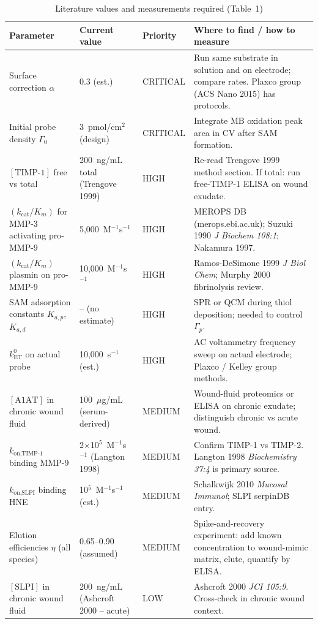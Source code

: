 \documentclass[10pt,a4paper]{article}
\begin{document}
\begin{table}[H]
\caption{Literature values and measurements required (Table~1)}
{\small
\begin{tabularx}{\linewidth}{p{3.6cm}p{2.8cm}p{1.4cm}p{6.0cm}}
\toprule
Parameter & Current value & Priority & Where to find / how to measure \\
\midrule
Surface correction $\alpha$ & 0.3 (est.) & CRITICAL & Run same substrate in solution and on electrode; compare rates. Plaxco group (ACS Nano 2015) has protocols. \\
Initial probe density $\Gamma_0$ & 3~pmol/cm$^2$ (design) & CRITICAL & Integrate MB oxidation peak area in CV after SAM formation. \\
$[\text{TIMP-1}]$ free vs total & 200~ng/mL total (Trengove 1999) & HIGH & Re-read Trengove 1999 method section. If total: run free-TIMP-1 ELISA on wound exudate. \\
$(k_\text{cat}/K_m)$ for MMP-3 activating pro-MMP-9 & 5,000~M$^{-1}$s$^{-1}$ & HIGH & MEROPS DB (merops.ebi.ac.uk); Suzuki 1990 \textit{J Biochem 108:1}; Nakamura 1997. \\
$(k_\text{cat}/K_m)$ plasmin on pro-MMP-9 & 10,000~M$^{-1}$s$^{-1}$ & HIGH & Ramos-DeSimone 1999 \textit{J Biol Chem}; Murphy 2000 fibrinolysis review. \\
SAM adsorption constants $K_{a,p}$, $K_{a,d}$ & -- (no estimate) & HIGH & SPR or QCM during thiol deposition; needed to control $\Gamma_p$. \\
$k_\text{ET}^0$ on actual probe & 10,000~s$^{-1}$ (est.) & HIGH & AC voltammetry frequency sweep on actual electrode; Plaxco / Kelley group methods. \\
$[\text{A1AT}]$ in chronic wound fluid & 100~$\mu$g/mL (serum-derived) & MEDIUM & Wound-fluid proteomics or ELISA on chronic exudate; distinguish chronic vs acute wound. \\
$k_\text{on,TIMP-1}$ binding MMP-9 & 2$\times$10$^5$~M$^{-1}$s$^{-1}$ (Langton 1998) & MEDIUM & Confirm TIMP-1 vs TIMP-2. Langton 1998 \textit{Biochemistry 37:4} is primary source. \\
$k_\text{on,SLPI}$ binding HNE & 10$^5$~M$^{-1}$s$^{-1}$ (est.) & MEDIUM & Schalkwijk 2010 \textit{Mucosal Immunol}; SLPI serpinDB entry. \\
Elution efficiencies $\eta$ (all species) & 0.65--0.90 (assumed) & MEDIUM & Spike-and-recovery experiment: add known concentration to wound-mimic matrix, elute, quantify by ELISA. \\
$[\text{SLPI}]$ in chronic wound fluid & 200~ng/mL (Ashcroft 2000 -- acute) & LOW & Ashcroft 2000 \textit{JCI 105:9}. Cross-check in chronic wound context. \\

\end{tabularx}}
\end{table}
\end{document}
